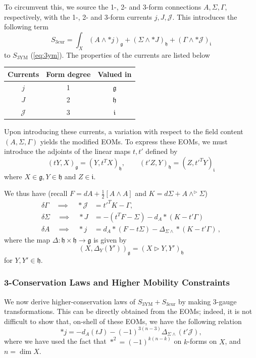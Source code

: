 \documentclass[onecolumn]{article}
\theoremstyle{theorem}
\theoremstyle{remark}
\theoremstyle{example}
\theoremstyle{definition}
\numberwithin{equation}{section}
\def\g{\mathfrak g}
\def\h{\mathfrak h}
\begin{document}
To circumvent this, we source the 1-, 2- and 3-form connections $A,\Sigma,\Gamma$, respectively, with the 1-, 2- and 3-form currents $j,J,\mathcal{J}$. This introduces the following term
\begin{equation}
    S_\text{3cur}=\int_X (A\wedge \ast j)_\g+ (\Sigma\wedge \ast J)_\h+ (\Gamma\wedge \ast\mathcal{J})_\mathfrak{i} \nonumber
\end{equation}
to $S_{\text{3YM}}$  (\ref{eq:3ym}). The properties of the currents are listed below 
\begin{center}
    \begin{tabular}{|c|c|c|}
    \hline
    Currents & Form degree & Valued in \\
    \hline
    $j$ & 1 & $\mathfrak{g}$ \\ 
    $J$ & 2 & $\mathfrak{h}$ \\ 
    $\mathcal{J}$ & 3 & $\mathfrak{i}$\\
    \hline
    \end{tabular}
\end{center}
{Upon} introducing these currents, a variation with respect to the field content $(A,\Sigma,\Gamma)$ yields the modified EOMs. To express these EOMs, we must introduce the adjoints of the linear maps $t,t'$ defined by
\begin{equation*}
    (tY,X)_\mathfrak{g} = ( Y,t^TX)_\mathfrak{h},\qquad ( t'Z,Y)_\mathfrak{h} = (Z,t'^TY)_\mathfrak{i}
\end{equation*}
where $X\in\mathfrak{g},Y\in\mathfrak{h}$ and $Z\in\mathfrak{i}$. 

We thus have (recall $F=dA+\frac{1}{2}[A\wedge A]$ and $K= d\Sigma+A\wedge^\rhd \Sigma$)
\begin{align}
    \delta\Gamma \quad\implies \quad \ast \mathcal{J}&=t'^T K -\Gamma, \nonumber\\
    \delta \Sigma\quad\implies \quad\ast J &= -(t^TF-\Sigma) - d_A\ast(K-t'\Gamma) \nonumber\\
    \delta A \quad\implies\quad \ast j &=  d_A\ast(F-t\Sigma) - \Delta_{\Sigma \wedge} \ast(K-t'\Gamma)\label{3ymeom}\,,
 \end{align}
 where the map $\Delta: \mathfrak{h}\times \mathfrak{h}\to \mathfrak{g}$ is given by
 \begin{equation*}
     (X,\Delta_Y(Y'))_\mathfrak{g} = ( X\rhd Y,Y')_\mathfrak{h}
 \end{equation*}
 for $Y,Y'\in\mathfrak{h}$.


\subsubsection{3-Conservation Laws and Higher Mobility Constraints} 
We now derive  higher-conservation laws of $S_\text{3YM}+S_\text{3cur}$ by making 3-gauge transformations. This can be directly obtained from the EOMs; indeed, it is not difficult to show that, on-shell of these EOMs, we have the following relation
\begin{equation*}
    \ast j = -d_A (tJ) - (-1)^{3(n-3)} \Delta_{\Sigma\wedge}(t'\mathcal{J}),
\end{equation*}
where we have used the fact that $\ast^2 = (-1)^{k(n-k)}$ on $k$-forms on $X$, and $n=\operatorname{dim}X$. 
\end{document}
